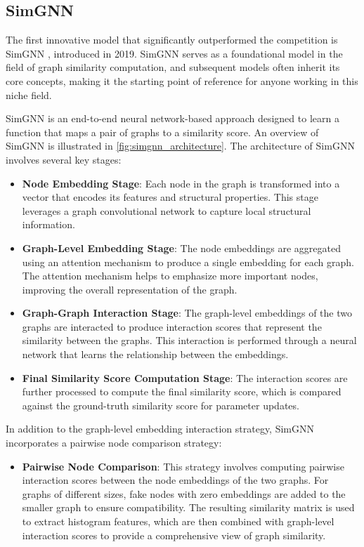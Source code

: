 \documentclass[../Thesis.tex]{subfiles}
\begin{document}
	\subsection{SimGNN}
	
	The first innovative model that significantly outperformed the competition is SimGNN \cite{simgnn__a_neural_network_approach_to_fast_graph_similarity_computation}, introduced in 2019. SimGNN serves as a foundational model in the field of graph similarity computation, and subsequent models often inherit its core concepts, making it the starting point of reference for anyone working in this niche field.
	
	SimGNN is an end-to-end neural network-based approach designed to learn a function that maps a pair of graphs to a similarity score. An overview of SimGNN is illustrated in \autoref{fig:simgnn_architecture}. The architecture of SimGNN involves several key stages:
	
	\begin{itemize}
		\item \textbf{Node Embedding Stage}: Each node in the graph is transformed into a vector that encodes its features and structural properties. This stage leverages a graph convolutional network to capture local structural information.
		\item \textbf{Graph-Level Embedding Stage}: The node embeddings are aggregated using an attention mechanism to produce a single embedding for each graph. The attention mechanism helps to emphasize more important nodes, improving the overall representation of the graph.
		\item \textbf{Graph-Graph Interaction Stage}: The graph-level embeddings of the two graphs are interacted to produce interaction scores that represent the similarity between the graphs. This interaction is performed through a neural network that learns the relationship between the embeddings.
		\item \textbf{Final Similarity Score Computation Stage}: The interaction scores are further processed to compute the final similarity score, which is compared against the ground-truth similarity score for parameter updates.
	\end{itemize}
	
	In addition to the graph-level embedding interaction strategy, SimGNN incorporates a pairwise node comparison strategy:
	
	\begin{itemize}
		\item \textbf{Pairwise Node Comparison}: This strategy involves computing pairwise interaction scores between the node embeddings of the two graphs. For graphs of different sizes, fake nodes with zero embeddings are added to the smaller graph to ensure compatibility. The resulting similarity matrix is used to extract histogram features, which are then combined with graph-level interaction scores to provide a comprehensive view of graph similarity.
	\end{itemize}
	
\end{document}
